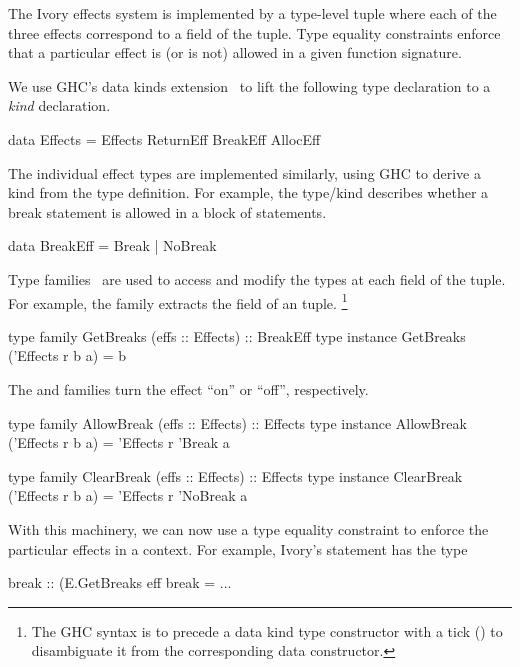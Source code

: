 The Ivory effects system is implemented by a type-level tuple
where each of the three effects correspond to a field of the
tuple. Type equality constraints enforce that a particular effect is (or is not)
allowed in a given function signature.

We use GHC's data kinds extension~\cite{data-kinds} to lift the following type
declaration to a \emph{kind} declaration.

\begin{code}
data Effects = Effects ReturnEff BreakEff AllocEff
\end{code}

\noindent
The individual effect types are implemented similarly, using GHC to derive a
kind from the type definition. For example, the  type/kind
describes whether a break statement is allowed in a block of statements.

\begin{code}
data BreakEff = Break | NoBreak
\end{code}

\noindent
Type families~\cite{typefamilies} are used to access and modify the types at each field of
the tuple. For example, the  family extracts the 
field of an  tuple.
\footnote{The GHC syntax is to precede a data kind type constructor with a tick ()
to disambiguate it from the corresponding data constructor.}

\begin{code}
type family   GetBreaks (effs :: Effects) :: BreakEff
type instance GetBreaks ('Effects r b a) = b
\end{code}

\noindent
The  and  families turn the effect ``on'' or
``off'', respectively.

\begin{code}
type family   AllowBreak (effs :: Effects) :: Effects
type instance AllowBreak ('Effects r b a) = 'Effects r 'Break a

type family   ClearBreak (effs :: Effects) :: Effects
type instance ClearBreak ('Effects r b a) = 'Effects r 'NoBreak a
\end{code}

With this machinery, we can now use a type equality constraint to enforce
the particular effects in a context. For example, Ivory's  statement
has the type

\begin{code}
break :: (E.GetBreaks eff %
break = ...
\end{code}

